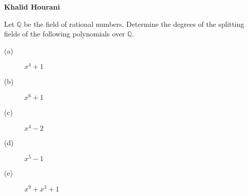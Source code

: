 \documentclass[12pt,leqno]{article}
\numberwithin{equation}{section}
\newcommand{\question}[2] {\vspace{.25in} \noindent\fbox{#1} #2 \vspace{.10in}}
\theoremstyle{definition}
\begin{document}
\thispagestyle{plain}
\begin{flushright}
\large{\textbf{Khalid Hourani\\
}}
\end{flushright}

\question{6}{Let $\mathbb{Q}$ be the field of rational numbers. Determine the degrees of the splitting fields of the following polynomials over $\mathbb{Q}$.}
\begin{description}
 \item [(a)] $x^4+1$
 \item [(b)] $x^6+1$
 \item [(c)] $x^4-2$
 \item [(d)] $x^5-1$
 \item [(e)] $x^9+x^3+1$
\end{description}
\end{document}

